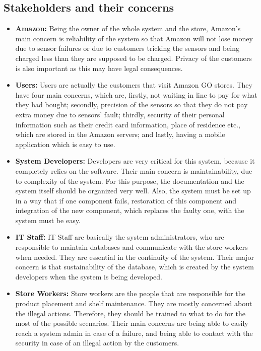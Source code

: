 \documentclass[11pt]{article}
\begin{document}
    \subsection{Stakeholders and their concerns}
        \begin{itemize}
            
            \item {\textbf{Amazon:}}
                Being the owner of the whole system and the store, Amazon's main concern is reliability of the system so that Amazon will 
                not lose money due to sensor failures or due to customers tricking the sensors and being charged less than they are supposed to be charged.
                Privacy of the customers is also important as this may have legal consequences.

            \item {\textbf{Users:}}
                Users are actually the customers that visit Amazon GO stores. They have four main concerns, which are, firstly, not waiting 
                in line to pay for what they had bought; secondly, precision of the sensors so that they do not pay extra money
                due to sensors' fault; thirdly, security of their personal information such as their credit card information, place of residence etc., 
                which are stored in the Amazon servers; and lastly, having a mobile application which is easy to use.
               
            \item {\textbf{System Developers:}}
                Developers are very critical for this system, because it completely relies on the software. Their main concern is maintainability, due
                to complexity of the system. For this purpose, the documentation and the system itself should be organized very well. Also, the system 
                must be set up in a way that if one component fails, restoration of this component and integration of the new component, which replaces the 
                faulty one, with the system must be easy.

            \item {\textbf{IT Staff:}}
                IT Staff are basically the system administrators, who are responsible to maintain databases and communicate with the store workers when needed.
                They are essential in the continuity of the system. Their major concern is that sustainability of the database, which is created by the system
                developers when the system is being developed. 

            \item {\textbf{Store Workers:}}
                Store workers are the people that are responsible for the product placement and shelf maintenance. They are mostly concerned about the 
                illegal actions. Therefore, they should be trained to what to do for the most of the possible scenarios. 
                Their main concerns are being able to easily reach a system admin in case of a failure, and being able to contact with the security
                in case of an illegal action by the customers.  
        \end{itemize}
\end{document}
